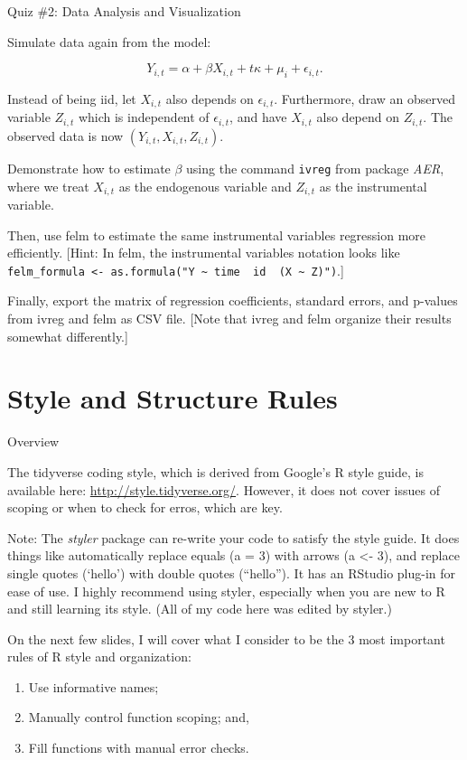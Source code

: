 \documentclass[10pt,ignorenonframetext,]{beamer}
\providecommand{\tightlist}{%
\setlength{\itemsep}{0pt}\setlength{\parskip}{0pt}}
\begin{document}
\begin{frame}[fragile]{Quiz \#2: Data Analysis and Visualization}

Simulate data again from the model:

\[
Y_{i,t} = \alpha + \beta X_{i,t} + t\kappa  + \mu_i + \epsilon_{i,t}.
\]

Instead of being iid, let \(X_{i,t}\) also depends on
\(\epsilon_{i,t}\). Furthermore, draw an observed variable \(Z_{i,t}\)
which is independent of \(\epsilon_{i,t}\), and have \(X_{i,t}\) also
depend on \(Z_{i,t}\). The observed data is now
\((Y_{i,t},X_{i,t},Z_{i,t})\).

Demonstrate how to estimate \(\beta\) using the command \texttt{ivreg}
from package \emph{AER}, where we treat \(X_{i,t}\) as the endogenous
variable and \(Z_{i,t}\) as the instrumental variable.

Then, use felm to estimate the same instrumental variables regression
more efficiently. {[}Hint: In felm, the instrumental variables notation
looks like
\texttt{felm\_formula\ \textless{}-\ as.formula("Y\ \textasciitilde{}\ time\ \textbar{}\ id\ \textbar{}\ (X\ \textasciitilde{}\ Z)")}.{]}

Finally, export the matrix of regression coefficients, standard errors,
and p-values from ivreg and felm as CSV file. {[}Note that ivreg and
felm organize their results somewhat differently.{]}

\end{frame}

\section{Style and Structure Rules}\label{style-and-structure-rules}

\begin{frame}{Overview}

The tidyverse coding style, which is derived from Google's R style
guide, is available here: \url{http://style.tidyverse.org/}. However, it
does not cover issues of scoping or when to check for erros, which are
key.

Note: The \emph{styler} package can re-write your code to satisfy the
style guide. It does things like automatically replace equals (a = 3)
with arrows (a \textless{}- 3), and replace single quotes (`hello') with
double quotes (``hello''). It has an RStudio plug-in for ease of use. I
highly recommend using styler, especially when you are new to R and
still learning its style. (All of my code here was edited by styler.)

On the next few slides, I will cover what I consider to be the 3 most
important rules of R style and organization:

\begin{enumerate}
\def\labelenumi{\arabic{enumi}.}
\tightlist
\item
  Use informative names;
\item
  Manually control function scoping; and,
\item
  Fill functions with manual error checks.
\end{enumerate}

\end{frame}
\end{document}

